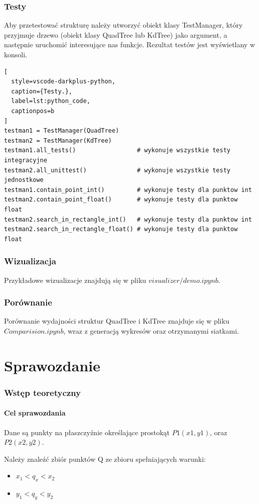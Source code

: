 \documentclass{lab}
\begin{document}
\section{Testy}
Aby przetestować strukturę należy utworzyć obiekt klasy TestManager, który przyjmuje drzewo (obiekt klasy QuadTree lub KdTree) jako argument, a następnie uruchomić interesujące nas funkcje. Rezultat testów jest wyświetlany w konsoli.
\begin{lstlisting}[
  style=vscode-darkplus-python,
  caption={Testy.},
  label=lst:python_code,
  captionpos=b
]
testman1 = TestManager(QuadTree)
testman2 = TestManager(KdTree)
testman1.all_tests()                 # wykonuje wszystkie testy integracyjne
testman2.all_unittest()              # wykonuje wszystkie testy jednostkowe
testman1.contain_point_int()         # wykonuje testy dla punktow int
testman2.contain_point_float()       # wykonuje testy dla punktow float
testman2.search_in_rectangle_int()   # wykonuje testy dla punktow int
testman2.search_in_rectangle_float() # wykonuje testy dla punktow float
\end{lstlisting}

\section{Wizualizacja}
Przykładowe wizualizacje znajdują się w pliku $visualizer/demo.ipynb$.

\section{Porównanie}
Porównanie wydajności struktur QuadTree i KdTree znajduje się w pliku $Comparision.ipynb$, wraz z generacją wykresów oraz otrzymanymi siatkami.

\newpage
\part{Sprawozdanie}
\section{Wstęp teoretyczny}
\subsection{Cel sprawozdania}
Dane są punkty na płaszczyźnie określające prostokąt $P1(x1,y1)$, oraz $P2(x2,y2)$. 

Należy znaleźć zbiór punktów Q ze zbioru spełniających warunki:
\begin{itemize}
    \item $x_1 < q_x < x_2$
    \item $y_1 < q_y < y_2$
\end{itemize}
\end{document}
